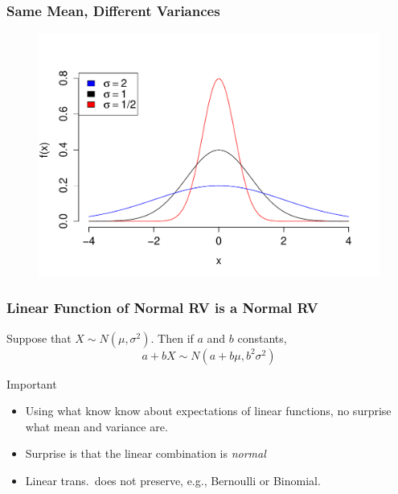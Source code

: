 \documentclass[handout]{beamer}
\begin{document}


\begin{frame}
\frametitle{Same Mean, Different Variances}

\begin{figure}
\includegraphics[scale = 0.62]{./images/normal_std_devs}
\end{figure}
\end{frame}



\begin{frame}
\frametitle{Linear Function of Normal RV is a Normal RV}


Suppose that $X \sim N(\mu, \sigma^2)$. Then if $a$ and $b$ constants,
$$\boxed{a + bX \sim N(a + b\mu, b^2 \sigma^2)}$$


\begin{block}{Important}
	\begin{itemize}
		\item  Using what know know about expectations of linear functions, no surprise what mean and variance are.
		\item Surprise is that the linear combination is \emph{\alert{normal}}
		\item Linear trans.\ does not preserve, e.g.,  Bernoulli or Binomial.
	\end{itemize}
\end{block}

\end{frame}
\end{document}
